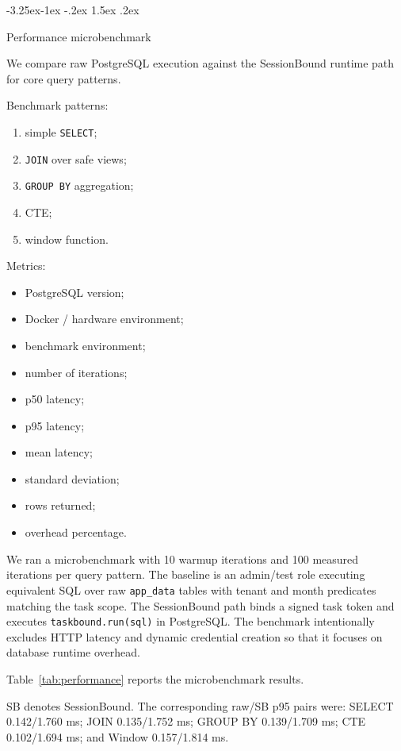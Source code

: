\documentclass[10pt,twocolumn]{article}
\makeatletter
\providecommand{\tightlist}{%
  \setlength{\itemsep}{0pt}\setlength{\parskip}{0pt}}
\renewcommand\subsection{\@startsection{subsection}{2}{\z@}%
  {-3.25ex\@plus -1ex \@minus -.2ex}%
  {1.5ex \@plus .2ex}%
  {\normalfont\large\bfseries\raggedright}}
\makeatother
\begin{document}
\hypertarget{performance-microbenchmark}{%
\subsection{Performance
microbenchmark}\label{performance-microbenchmark}}

We compare raw PostgreSQL execution against the SessionBound runtime
path for core query patterns.

Benchmark patterns:

\begin{enumerate}
\def\labelenumi{\arabic{enumi}.}
\tightlist
\item
  simple \texttt{SELECT};
\item
  \texttt{JOIN} over safe views;
\item
  \texttt{GROUP\ BY} aggregation;
\item
  CTE;
\item
  window function.
\end{enumerate}

Metrics:

\begin{itemize}
\tightlist
\item
  PostgreSQL version;
\item
  Docker / hardware environment;
\item
  benchmark environment;
\item
  number of iterations;
\item
  p50 latency;
\item
  p95 latency;
\item
  mean latency;
\item
  standard deviation;
\item
  rows returned;
\item
  overhead percentage.
\end{itemize}

We ran a microbenchmark with 10 warmup iterations and 100 measured
iterations per query pattern. The baseline is an admin/test role
executing equivalent SQL over raw
\texttt{app\_data} tables with tenant and month predicates matching the
task scope. The SessionBound path binds a signed task token and executes
\texttt{taskbound.run(sql)} in PostgreSQL. The benchmark intentionally
excludes HTTP latency and dynamic credential creation so that it focuses
on database runtime overhead.

Table~\ref{tab:performance} reports the microbenchmark results.

SB denotes SessionBound. The corresponding raw/SB p95 pairs were: SELECT
0.142/1.760 ms; JOIN 0.135/1.752 ms; GROUP BY 0.139/1.709 ms; CTE
0.102/1.694 ms; and Window 0.157/1.814 ms.
\end{document}
